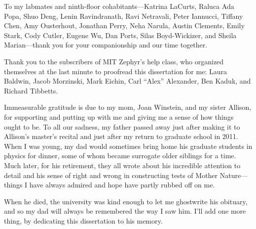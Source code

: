 To my labmates and ninth-floor cohabitants---Katrina LaCurts, Raluca
Ada Popa, Shuo Deng, Lenin Ravindranath, Ravi Netravali, Peter
Iannucci, Tiffany Chen, Amy Ousterhout, Jonathan Perry, Neha Narula,
Austin Clements, Emily Stark, Cody Cutler, Eugene Wu, Dan Ports, Silas
Boyd-Wickizer, and Sheila Marian---thank you for your companionship
and our time together.

Thank you to the subscribers of MIT Zephyr's help class, who
organized themselves at the last minute to proofread this
dissertation for me: Laura Baldwin, Jacob Morzinski, Mark Eichin, Carl
``Alex'' Alexander, Ben Kaduk, and Richard Tibbetts.

Immeasurable gratitude is due to my mom, Joan Winstein, and my sister Allison,
for supporting and putting up with me and giving me a sense of how
things ought to be. To all our sadness, my father passed away just
after making it to Allison's master's recital and just after my return
to graduate school in 2011. When I was young, my dad would sometimes
bring home his graduate students in physics for dinner, some of whom
became surrogate older siblings for a time. Much later, for his
retirement, they all wrote about his incredible attention to detail
and his sense of right and wrong in constructing tests of Mother
Nature---things I have always admired and hope have partly
rubbed off on me.

When he died, the university was kind enough to let me ghostwrite his
obituary, and so my dad will always be remembered the way I saw
him. I'll add one more thing, by dedicating this dissertation to his
memory.
